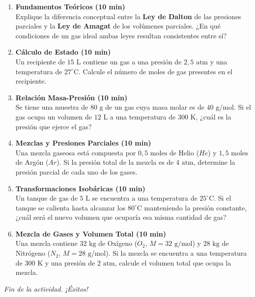 \documentclass[a4paper,12pt]{article}
\begin{document}
\begin{enumerate}[label=\textbf{\arabic*.}, leftmargin=*]

    \item \textbf{Fundamentos Teóricos (10 min)}\\
    Explique la diferencia conceptual entre la \textbf{Ley de Dalton} de las presiones parciales y la \textbf{Ley de Amagat} de los volúmenes parciales. ¿En qué condiciones de un gas ideal ambas leyes resultan consistentes entre sí?

    \item \textbf{Cálculo de Estado (10 min)}\\
    Un recipiente de $15\text{ L}$ contiene un gas a una presión de $2,5\text{ atm}$ y una temperatura de $27^\circ\text{C}$. Calcule el número de moles de gas presentes en el recipiente.

    \item \textbf{Relación Masa-Presión (10 min)}\\
    Se tiene una muestra de $80\text{ g}$ de un gas cuya masa molar es de $40\text{ g/mol}$. Si el gas ocupa un volumen de $12\text{ L}$ a una temperatura de $300\text{ K}$, ¿cuál es la presión que ejerce el gas?

    \item \textbf{Mezclas y Presiones Parciales (10 min)}\\
    Una mezcla gaseosa está compuesta por $0,5\text{ moles}$ de Helio ($He$) y $1,5\text{ moles}$ de Argón ($Ar$). Si la presión total de la mezcla es de $4\text{ atm}$, determine la presión parcial de cada uno de los gases.

    \item \textbf{Transformaciones Isobáricas (10 min)}\\
    Un tanque de gas de $5\text{ L}$ se encuentra a una temperatura de $25^\circ\text{C}$. Si el tanque se calienta hasta alcanzar los $80^\circ\text{C}$ manteniendo la presión constante, ¿cuál será el nuevo volumen que ocuparía esa misma cantidad de gas?

    \item \textbf{Mezcla de Gases y Volumen Total (10 min)}\\
    Una mezcla contiene $32\text{ kg}$ de Oxígeno ($O_2$, $M=32\text{ g/mol}$) y $28\text{ kg}$ de Nitrógeno ($N_2$, $M=28\text{ g/mol}$). Si la mezcla se encuentra a una temperatura de $300\text{ K}$ y una presión de $2\text{ atm}$, calcule el volumen total que ocupa la mezcla.

\end{enumerate}

\vfill
\begin{center}
    \textit{Fin de la actividad. ¡Éxitos!}
\end{center}
\end{document}
